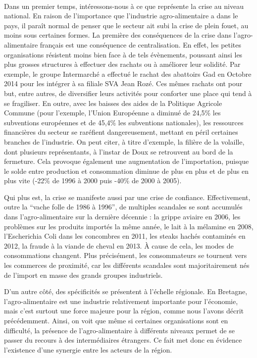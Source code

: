 \documentclass[a4paper,12pt]{report}
\begin{document}
			\paragraph{}Dans un premier temps, intéressons-nous à ce que représente la crise au niveau national. En raison de l'importance que l'industrie agro-alimentaire a dans le pays, il paraît normal de penser que le secteur ait subi la crise de plein fouet, au moins sous certaines formes. La première des conséquences de la crise dans l'agro-alimentaire français est une conséquence de centralisation. En effet, les petites organisations résistent moins bien face à de tels évènements, poussant ainsi les plus grosses structures à effectuer des rachats ou à améliorer leur solidité. Par exemple, le groupe Intermarché a effectué le rachat des abattoirs Gad en Octobre 2014 pour les intégrer à sa filiale SVA Jean Rozé. Ces mêmes rachats ont pour but, entre autres, de diversifier leurs activités pour conforter une place qui tend à se fragiliser. En outre, avec les baisses des aides de la Politique Agricole Commune (pour l’exemple, l’Union Européenne a diminué de 24,5\% les subventions européennes et de 45,4\% les subventions nationales), les ressources financières du secteur se raréfient dangereusement, mettant en péril certaines branches de l’industrie. On peut citer, à titre d’exemple, la filière de la volaille, dont plusieurs représentants, à l’instar de Doux se retrouvent au bord de la fermeture. Cela provoque également une augmentation de l’importation, puisque le solde entre production et consommation diminue de plus en plus et de plus en plus vite (-22\% de 1996 à 2000 puis -40\% de 2000 à 2005)\cite{AvenirExploitationVolailleBretonne}.

			Qui plus est, la crise se manifeste aussi par une crise de confiance. Effectivement, outre la “vache folle de 1986 à 1996”, de multiples scandales se sont accumulés dans l’agro-alimentaire sur la dernière décennie\cite{Scandales} : la grippe aviaire en 2006, les problèmes sur les produits importés la même année, le lait à la mélamine en 2008, l’Escherichia Coli dans les concombres en 2011, les steaks hachés contaminés en 2012, la fraude à la viande de cheval en 2013. À cause de cela, les modes de consommations changent. Plus précisément, les consommateurs se tournent vers les commerces de proximité, car les différents scandales sont majoritairement nés de l’import en masse des grands groupes industriels.
			
			D’un autre côté, des spécificités se présentent à l’échelle régionale. En Bretagne, l’agro-alimentaire est une industrie relativement importante pour l’économie, mais c’est surtout une force majeure pour la région, comme nous l'avons décrit précédemment. Ainsi, on voit que même si certaines organisations sont en difficulté, la présence de l’agro-alimentaire à différents niveaux permet de se passer du recours à des intermédiaires étrangers. Ce fait met donc en évidence l’existence d’une synergie entre les acteurs de la région.
\end{document}
